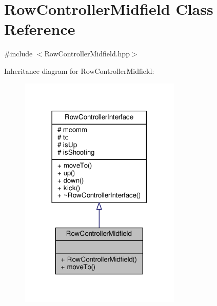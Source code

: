 \hypertarget{class_row_controller_midfield}{}\section{Row\+Controller\+Midfield Class Reference}
\label{class_row_controller_midfield}


{\ttfamily \#include $<$Row\+Controller\+Midfield.\+hpp$>$}



Inheritance diagram for Row\+Controller\+Midfield\+:\nopagebreak
\begin{figure}[H]
\begin{center}
\leavevmode
\includegraphics[width=218pt]{class_row_controller_midfield__inherit__graph}
\end{center}
\end{figure}



